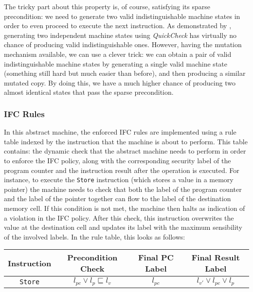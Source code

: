 \documentclass[sigconf, anonymous]{acmart}
\newcommand{\quickcheck}{\textit{QuickCheck}\xspace}
\begin{document}
The tricky part about this property is, of course, satisfying its sparse
precondition: we need to generate two valid indistinguishable machine states in
order to even proceed to execute the next instruction.
%
As demonstrated by \citeauthor{lampropoulos2019coverage}, generating two
independent machine states using \quickcheck has virtually no chance of
producing valid indistinguishable ones.
%
However, having the mutation mechanism available, we can use a clever trick: we
can obtain a pair of valid indistinguishable machine states by generating a
single valid machine state (something still hard but much easier than before),
and then producing a similar mutated copy.
%
By doing this, we have a much higher chance of producing two almost identical
states that pass the sparse precondition.

\subsubsection{IFC Rules}

In this abstract machine, the enforced IFC rules are implemented using a rule
table indexed by the instruction that the machine is about to perform.
%
This table contains: the dynamic check that the abstract machine needs to
perform in order to enforce the IFC policy, along with the corresponding
security label of the program counter and the instruction result after the
operation is executed.
%
For instance, to execute the \texttt{Store} instruction (which stores a value in
a memory pointer) the machine needs to check that both the label of the program
counter and the label of the pointer together can flow to the label of the
destination memory cell.
%
If this condition is not met, the machine then halts as indication of a
violation in the IFC policy.
%
After this check, this instruction overwrites the value at the destination cell
and updates its label with the maximum sensibility of the involved labels.
%
In the rule table, this looks as follows:

\begin{center}
\footnotesize
\begin{tabular}{|c|c|c|c|}
\hline
\textbf{Instruction}
& \textbf{Precondition Check}
& \textbf{Final PC Label}
& \textbf{Final Result Label} \\
\hline
\texttt{Store}
& $l_{pc} \vee l_{p} \sqsubseteq l_{v}$
& $l_{pc}$
& $l_{v'} \vee l_{pc} \vee l_{p}$ \\
\hline
\end{tabular}
\end{center}
\end{document}
